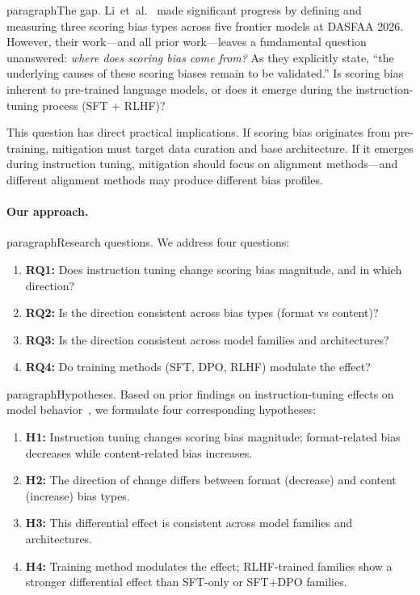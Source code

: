 \documentclass[11pt,twocolumn]{article}
\begin{document}
paragraph{The gap.}
Li~et~al.~\cite{li2025scoring} made significant progress by defining and measuring three scoring bias types across five frontier models at DASFAA 2026. However, their work---and all prior work---leaves a fundamental question unanswered: \emph{where does scoring bias come from?} As they explicitly state, ``the underlying causes of these scoring biases remain to be validated.'' Is scoring bias inherent to pre-trained language models, or does it emerge during the instruction-tuning process (SFT + RLHF)?

This question has direct practical implications. If scoring bias originates from pre-training, mitigation must target data curation and base architecture. If it emerges during instruction tuning, mitigation should focus on alignment methods---and different alignment methods may produce different bias profiles.

\paragraph{Our approach.}

paragraph{Research questions.} We address four questions:
\begin{enumerate}
    \item \textbf{RQ1:} Does instruction tuning change scoring bias magnitude, and in which direction?
    \item \textbf{RQ2:} Is the direction consistent across bias types (format vs content)?
    \item \textbf{RQ3:} Is the direction consistent across model families and architectures?
    \item \textbf{RQ4:} Do training methods (SFT, DPO, RLHF) modulate the effect?
\end{enumerate}

paragraph{Hypotheses.} Based on prior findings on instruction-tuning effects on model behavior~\cite{pan2025user,thakur2024judging}, we formulate four corresponding hypotheses:
\begin{enumerate}
    \item \textbf{H1:} Instruction tuning changes scoring bias magnitude; format-related bias decreases while content-related bias increases.
    \item \textbf{H2:} The direction of change differs between format (decrease) and content (increase) bias types.
    \item \textbf{H3:} This differential effect is consistent across model families and architectures.
    \item \textbf{H4:} Training method modulates the effect; RLHF-trained families show a stronger differential effect than SFT-only or SFT+DPO families.
\end{enumerate}
\end{document}
